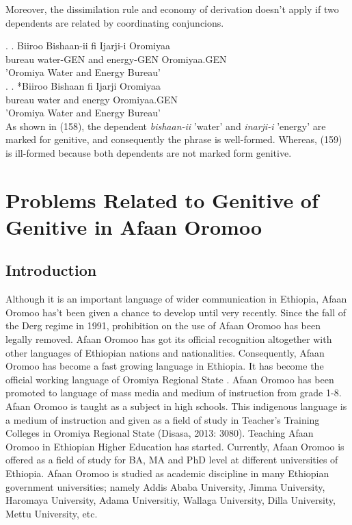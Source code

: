 \documentclass[11pt,a4paper]{article}
\begin{document}
	Moreover, the dissimilation rule and economy of derivation doesn't apply if two dependents are related by coordinating conjuncions.
	
	\ex.
	\ag.
	Biiroo Bishaan-ii fi Ijarji-i Oromiyaa\\
	bureau water-GEN and energy-GEN Oromiyaa.GEN\\
	'Oromiya Water and Energy Bureau'\\
	
	\ex.
	\ag.
	*Biiroo Bishaan fi Ijarji Oromiyaa\\
	bureau water and energy Oromiyaa.GEN\\
	'Oromiya Water and Energy Bureau'\\
	
	As shown in (158), the dependent \emph{bishaan-ii} 'water' and \emph{inarji-i} 'energy' are marked for genitive, and consequently the phrase is well-formed. Whereas, (159) is ill-formed because both dependents are not marked form genitive.


	
	\section{Problems Related to Genitive of Genitive in Afaan Oromoo}

\subsection{Introduction}

Although it is an important language of wider communication in Ethiopia, Afaan Oromoo has’t been given a chance to develop until very recently. Since the fall of the Derg regime in 1991, prohibition on the use of Afaan Oromoo has been legally removed. Afaan Oromoo has got its official recognition altogether with other languages of Ethiopian nations and nationalities.  Consequently, Afaan Oromoo has become a fast growing language in Ethiopia. It has become the official working language of Oromiya Regional State \cite{bulcha1997politics}. Afaan Oromoo has been 
promoted to language of mass media and medium of instruction from grade 1-8. Afaan Oromoo is taught as a subject in high schools. This indigenous language is a medium of instruction and given as a field of study in Teacher’s Training Colleges in Oromiya Regional State (Disasa, 2013: 3080). Teaching Afaan 
Oromoo in Ethiopian Higher Education has started. Currently, Afaan Oromoo is offered as a field of study for BA, MA and PhD level at different universities of Ethiopia. Afaan Oromoo is studied as academic discipline in many Ethiopian government universities; namely Addis Ababa University, 
Jimma University, Haromaya University, Adama Universitiy, Wallaga University, Dilla University, Mettu University, etc. 
\end{document}
